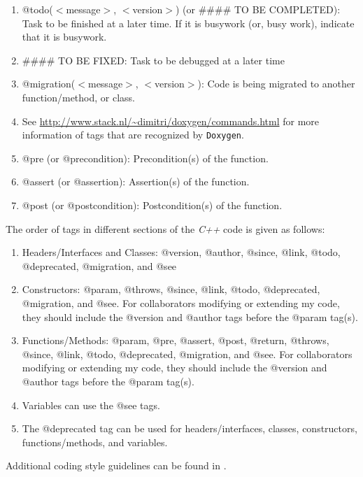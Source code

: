 \documentclass[letter,12pt]{article}
\begin{document}
\begin{enumerate}
\item @todo($<$message$>$, $<$version$>$) (or \#\#\#\# TO BE COMPLETED): Task to be finished at a later time. If it is busywork (or, busy work), indicate that it is busywork.
\item \#\#\#\# TO BE FIXED: Task to be debugged at a later time
\item @migration($<$message$>$, $<$version$>$): Code is being migrated to another function/method, or class.
\item See \url{http://www.stack.nl/~dimitri/doxygen/commands.html} for more information of tags that are recognized by {\tt Doxygen}.
\item @pre (or @precondition): Precondition(s) of the function.
\item @assert (or @assertion): Assertion(s) of the function.
\item @post (or @postcondition): Postcondition(s) of the function.
\end{enumerate}

The order of tags in different sections of the {\it C++} code is given as follows: \vspace{-0.3cm}
\begin{enumerate} \itemsep -4pt
\item Headers/Interfaces and Classes: @version, @author, @since, @link, @todo, @deprecated, @migration, and @see
\item Constructors: @param, @throws, @since, @link, @todo, @deprecated, @migration, and @see. For collaborators modifying or extending my code, they should include the @version and @author tags before the @param tag(s).
\item Functions/Methods: @param, @pre, @assert, @post, @return, @throws, @since, @link, @todo, @deprecated, @migration, and @see. For collaborators modifying or extending my code, they should include the @version and @author tags before the @param tag(s).
\item Variables can use the @see tags.
\item The @deprecated tag can be used for headers/interfaces, classes, constructors, functions/methods, and variables.
\end{enumerate}

Additional coding style guidelines can be found in \cite{Basalaj2013,ProgrammingResearchLtdStaff2013,Thereska20XY,Hoff2008a,ScienceInfusionSoftwareEngineeringProcessGroupStaff2006,Cargill1992,Misfeldt2004}. \\
\end{document}
